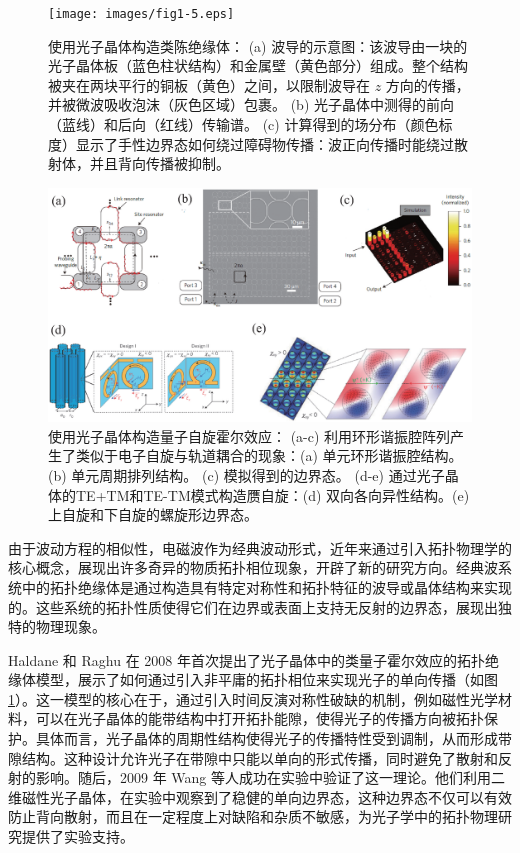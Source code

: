 \begin{figure}[h!]
    \centering
    \texttt{[image: images/fig1-5.eps]} 
    \caption{使用光子晶体构造类陈绝缘体\cite{g2}：
    (a) 波导的示意图：该波导由一块的光子晶体板（蓝色柱状结构）和金属壁（黄色部分）组成。整个结构被夹在两块平行的铜板（黄色）之间，以限制波导在 \( z \) 方向的传播，并被微波吸收泡沫（灰色区域）包裹。
    (b) 光子晶体中测得的前向（蓝线）和后向（红线）传输谱。
    (c) 计算得到的场分布（颜色标度）显示了手性边界态如何绕过障碍物传播：波正向传播时能绕过散射体，并且背向传播被抑制。
    }
    \label{fig_1_5}
\end{figure}

\begin{figure}[h!]
    \centering
    \includegraphics[width=1\textwidth]{images/fig1-6.eps} 
    \caption{使用光子晶体构造量子自旋霍尔效应：
    (a-c) 利用环形谐振腔阵列产生了类似于电子自旋与轨道耦合的现象\cite{g2}：(a) 单元环形谐振腔结构。 (b) 单元周期排列结构。 (c) 模拟得到的边界态。
    (d-e) 通过光子晶体的TE+TM和TE-TM模式构造赝自旋\cite{g-add-1}：(d) 双向各向异性结构。(e) 上自旋和下自旋的螺旋形边界态。
    }
    \label{fig_1_6}
\end{figure}

由于波动方程的相似性，电磁波作为经典波动形式，近年来通过引入拓扑物理学的核心概念，展现出许多奇异的物质拓扑相位现象，开辟了新的研究方向。经典波系统中的拓扑绝缘体是通过构造具有特定对称性和拓扑特征的波导或晶体结构来实现的。这些系统的拓扑性质使得它们在边界或表面上支持无反射的边界态，展现出独特的物理现象。

Haldane 和 Raghu 在 2008 年首次提出了光子晶体中的类量子霍尔效应的拓扑绝缘体模型\cite{g1}，展示了如何通过引入非平庸的拓扑相位来实现光子的单向传播（如图 \ref{fig_1_5}）。这一模型的核心在于，通过引入时间反演对称性破缺的机制，例如磁性光学材料，可以在光子晶体的能带结构中打开拓扑能隙，使得光子的传播方向被拓扑保护。具体而言，光子晶体的周期性结构使得光子的传播特性受到调制，从而形成带隙结构。这种设计允许光子在带隙中只能以单向的形式传播，同时避免了散射和反射的影响。随后，2009 年 Wang 等人成功在实验中验证了这一理论\cite{g2}。他们利用二维磁性光子晶体，在实验中观察到了稳健的单向边界态，这种边界态不仅可以有效防止背向散射，而且在一定程度上对缺陷和杂质不敏感，为光子学中的拓扑物理研究提供了实验支持。

